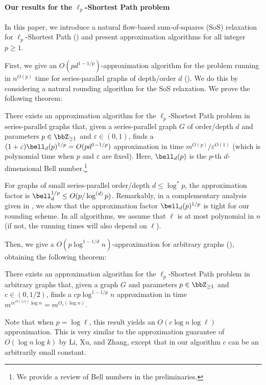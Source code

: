 \documentclass[11pt,a4paper]{article}
\begin{document}
\paragraph{Our results for the $\ell_p$-Shortest Path problem}
In this paper, we introduce a natural flow-based sum-of-squares (SoS) relaxation for $\ell_p$-Shortest Path () and present approximation algorithms for all integer $p\geq 1$. 

First, we give an $O(pd^{1-1/p})$-approximation algorithm for the problem running in $n^{O(p)}$ time for series-parallel graphs of depth/order $d$ (). We do this by considering a natural rounding algorithm for the SoS relaxation.
We prove the following theorem:
\begin{theorem}\label{thm:intro-series-parallel-guarantees}
There exists an approximation algorithm for the $\ell_p$-Shortest Path problem in series-parallel graphs that, given a series-parallel graph $G$ of order/depth $d$ and parameters $p\in \bbZ_{\geq 1}$ and $\varepsilon \in(0, 1)$,  finds a
$(1+\varepsilon)\bell_d(p)^{1/p}= O(pd^{1-1/p})$  approximation in time $m^{O(p)}/\varepsilon^{O(1)}$ (which is polynomial time when $p$ and $\varepsilon$ are fixed). Here, $\bell_d(p)$ is the $p$-{th} $d$-dimensional Bell number.\footnote{We provide a review of Bell numbers in the preliminaries.}
\end{theorem}
For graphs of small series-parallel order/depth $d\leq \log^* p$, the approximation factor is $\bell_d^{1/p} \leq O(p/\log^{(d)}p)$.  
Remarkably, in a complementary analysis given in , we show that the approximation factor $\bell_d(p)^{1/p}$ is tight for our rounding scheme. 
In all algorithms, we assume that $\ell$ is at most polynomial in $n$ (if not, the running times will also depend on $\ell$).

Then, we give a $O(p\log^{1-1/d} n)$-approximation for arbitrary graphs (), obtaining the following theorem:
\begin{theorem}\label{thm:intro-general-graphs-guarantees}
    There exists an approximation algorithm for the $\ell_p$-Shortest Path problem in arbitrary graphs that, given a graph $G$ and parameters $p\in\bbZ_{\geq 1}$ and $c\in(0,1/2)$, finds a $cp\log^{1-1/p}n$ approximation in time $m^{c e^{O(1/c)} \log n} = m^{O_c(\log n)}$. 
\end{theorem}
Note that when $p = \log \ell$, this result yields an $O(c\log n \log \ell)$ approximation. This is very similar to the approximation guarantee of $O(\log n \log k)$ by Li, Xu, and Zhang, except that in our algorithm $c$ can be an arbitrarily small constant.
\end{document}
